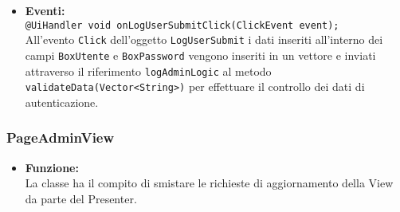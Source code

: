 {\begin{sloppypar}
{{{\begin{itemize}
					\texttt{+ void loadViewLogAdmin();}\\
					Visualizza la GUI\g~ di autenticazione dell'amministratore e seleziona le impostazioni di default\g~: 
					\texttt{BoxUtente} e \texttt{BoxPassword} vuoti e \texttt{LabelError} invisibile.\\
					
					\texttt{+ void removeViewLogAdmin();}\\
					Nasconde la GUI\g~ di login.\\
					
					\texttt{+ void errorView(String error);}\\
					Imposta e rende visibile \texttt{LabelError} inserendo il contenuto della stringa \texttt{error}.\\
				
				\item[] \textbf{Eventi:}\\
					\texttt{@UiHandler void onLogUserSubmitClick(ClickEvent event);}\\
					All'evento \texttt{Click} dell'oggetto \texttt{LogUserSubmit} i dati inseriti all'interno dei campi \texttt{BoxUtente} e \texttt{BoxPassword} vengono inseriti in un vettore e inviati attraverso il riferimento \texttt{logAdminLogic} al metodo \texttt{validateData(Vector<String>)} per effettuare il controllo dei dati di autenticazione.\\
			\end{itemize}
			}

		\subsubsection{PageAdminView}\label{ssub:PageAdminView}{
			\begin{itemize}
				\item[]  \textbf{Funzione:} \\
				La classe ha il compito di smistare le richieste di aggiornamento della View da parte del Presenter.\\
				

\end{itemize}}}}
\end{sloppypar}}
